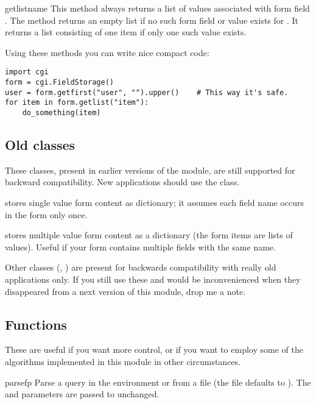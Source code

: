 \begin{methoddesc}[FieldStorage]{getlist}{name}
  This method always returns a list of values associated with form
  field .  The method returns an empty list if no such form
  field or value exists for .  It returns a list consisting
  of one item if only one such value exists.
\end{methoddesc}

Using these methods you can write nice compact code:

\begin{verbatim}
import cgi
form = cgi.FieldStorage()
user = form.getfirst("user", "").upper()    # This way it's safe.
for item in form.getlist("item"):
    do_something(item)
\end{verbatim}


\subsection{Old classes}

These classes, present in earlier versions of the  module,
are still supported for backward compatibility.  New applications
should use the  class.

 stores single value form content as
dictionary; it assumes each field name occurs in the form only once.

 stores multiple value form content as a
dictionary (the form items are lists of values).  Useful if your form
contains multiple fields with the same name.

Other classes (, ) are
present for backwards compatibility with really old applications only.
If you still use these and would be inconvenienced when they
disappeared from a next version of this module, drop me a note.


\subsection{Functions}

These are useful if you want more control, or if you want to employ
some of the algorithms implemented in this module in other
circumstances.

\begin{funcdesc}{parse}{fp}
  Parse a query in the environment or from a file (the file defaults
  to ).  The  and
   parameters are passed to 
  unchanged.
\end{funcdesc}

